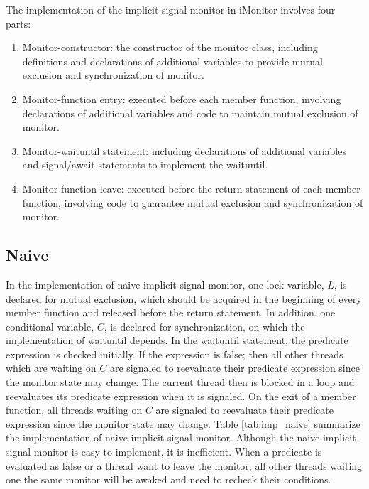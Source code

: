 \documentclass[preprint]{sigplanconf}
\begin{document}
The implementation of the implicit-signal monitor in iMonitor involves four 
parts:
\begin{enumerate}
  \item Monitor-constructor: the constructor of the monitor class, including 
    definitions and declarations of additional variables to provide mutual 
    exclusion and synchronization of monitor. 
  \item Monitor-function entry: executed before each member function, 
    involving declarations of additional variables and code to maintain
    mutual exclusion of monitor. 
  \item Monitor-waituntil statement: including declarations of additional
    variables and signal/await statements to implement the waituntil.
  \item Monitor-function leave: executed before the return statement of 
    each member function, involving code to guarantee mutual exclusion and 
    synchronization of monitor. 
\end{enumerate}


\subsection{Naive}

In the implementation of naive implicit-signal monitor, one lock variable, 
$L$, is declared for mutual exclusion, which should be acquired in 
the beginning of every member function and released before the return statement.
In addition, one conditional variable, $C$, is declared for 
synchronization, on which the implementation of waituntil depends. In the 
waituntil statement, the predicate expression is checked initially. If the 
expression is false; then all other threads which are waiting on $C$ are 
signaled to reevaluate their predicate expression since the monitor state may 
change. The current thread then is blocked in a loop and reevaluates its 
predicate expression when it is signaled. On the exit of a member function, 
all threads waiting on $C$ are signaled to reevaluate their predicate 
expression since the monitor state may change. Table \ref{tab:imp_naive} 
summarize the implementation of naive implicit-signal monitor. Although 
the naive implicit-signal monitor is easy to implement, it is inefficient. 
When a predicate is evaluated as false or a thread want to leave the monitor, 
all other threads waiting one the same monitor will be awaked and need to 
recheck their conditions.
\end{document}
